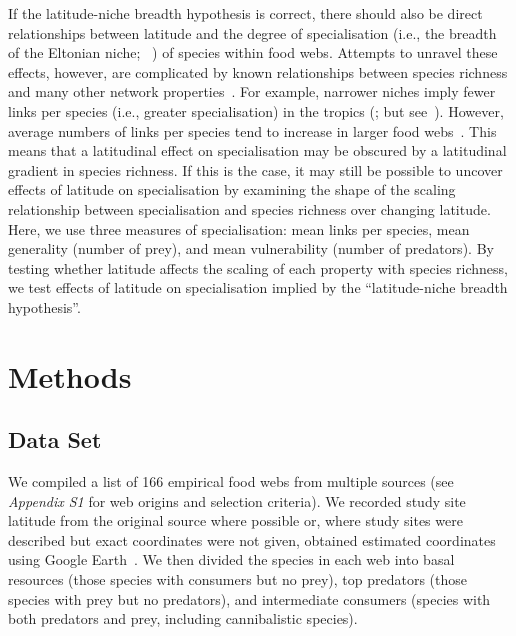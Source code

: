 \documentclass[12pt]{article}
\begin{document}
  If the latitude-niche breadth hypothesis is correct, there should also be direct relationships between latitude and the
  degree of specialisation (i.e., the breadth of the Eltonian niche; ~\citealp{Elton1927}) of species within food webs.
  Attempts to unravel these effects, however,
  are complicated by known relationships between species richness and many other network properties~\citep{Riede2010}. 
  For example,
  narrower niches imply fewer links per species (i.e., greater specialisation) in the tropics (\citealp{Marra1997,Dyer2007};
  but see~\citealp{Schleuning2012}). However,
  average numbers of links per species tend to increase in larger food webs~\citep{Dunne2006,Riede2010}. This means
  that a latitudinal effect on specialisation may be obscured by a latitudinal gradient in species richness. If this is
  the case, it may still be possible to uncover effects of latitude on specialisation by examining the shape of the scaling 
  relationship between specialisation and species richness over changing latitude. Here, we use three measures of specialisation:
  mean links per species, mean generality (number of prey), and mean vulnerability (number of predators). By testing whether
  latitude affects the scaling of each property with species richness, we test effects of latitude on specialisation implied by
  the ``latitude-niche breadth hypothesis''.


\section*{Methods}

  \subsection*{Data Set} 

    We compiled a list of 166 empirical food webs from
    multiple sources (see \emph{Appendix S1} for web origins and selection
    criteria). We recorded study site latitude from the original source where
    possible or, where study sites were described but exact coordinates were not
    given, obtained estimated coordinates using Google Earth~\citep{GoogleEarth}.
    We then divided the species in each web into basal resources (those species with
    consumers but no prey), top predators (those species with prey but no predators),
    and intermediate consumers (species with both predators and prey, including cannibalistic
    species). 
\end{document}
